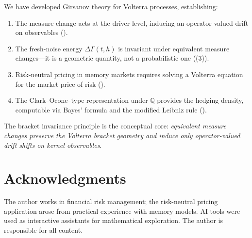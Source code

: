 \documentclass[11pt]{article}
\theoremstyle{plain}
\theoremstyle{definition}
\theoremstyle{remark}
\newcommand{\QQ}{\mathbb{Q}}
\newcommand{\dGamma}{\Delta\Gamma}
\begin{document}
We have developed Girsanov theory for Volterra processes, establishing:

\begin{enumerate}
\item The measure change acts at the driver level, inducing an operator-valued
drift on observables ().

\item The fresh-noise energy $\dGamma(t,h)$ is invariant under equivalent
measure changes---it is a geometric quantity, not a probabilistic one
((3)).

\item Risk-neutral pricing in memory markets requires solving a Volterra
equation for the market price of risk ().

\item The Clark--Ocone--type representation under $\QQ$ provides the hedging
density, computable via Bayes' formula and the modified Leibniz rule
().
\end{enumerate}

The bracket invariance principle is the conceptual core: \emph{equivalent
measure changes preserve the Volterra bracket geometry and induce only
operator-valued drift shifts on kernel observables}.

\section*{Acknowledgments}

The author works in financial risk management; the risk-neutral pricing
application arose from practical experience with memory models. AI tools
were used as interactive assistants for mathematical exploration. The
author is responsible for all content.

\end{document}
